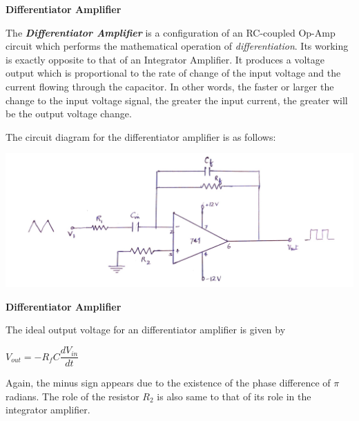 \par
\begin{center}
    \textbf{\large Differentiator Amplifier}
\end{center}
\noindent The \textbf{\emph{Differentiator Amplifier}} is a configuration of an RC-coupled Op-Amp circuit which performs the mathematical operation of \emph{differentiation}. Its working is exactly opposite to that of an Integrator Amplifier. It produces a voltage output which
is proportional to the rate of change of the input voltage and the current flowing through the
capacitor. In other words, the faster or larger the change to the input voltage signal, the greater
the input current, the greater will be the output voltage change.
\par
\noindent The circuit diagram for the differentiator amplifier is as follows:
\begin{center}
    \includegraphics[scale = 0.2]{Documents/diffcir.jpg}
\end{center}
\begin{center}
    \textbf{Differentiator Amplifier}
\end{center}
\noindent The ideal output voltage for an differentiator amplifier is given by
\begin{center}
    $V_{out} = - R_f C \dfrac{dV_{in}}{dt}$
\end{center}
\noindent Again, the minus sign appears due to the existence of the phase difference of $\pi$ radians. The role of the resistor $R_2$ is also same to that of its role in the integrator amplifier.
